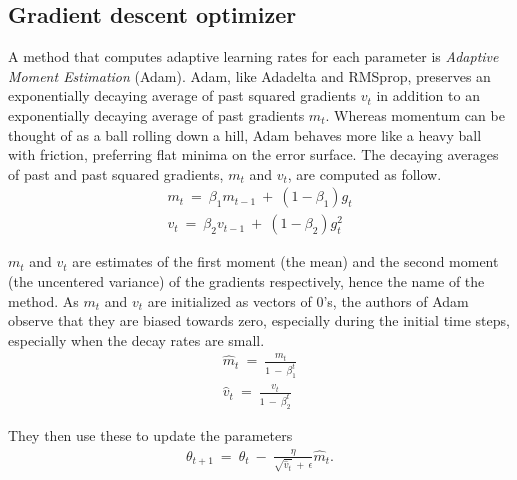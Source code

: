 \subsection{Gradient descent optimizer}
\label{gradient_optimizer}
\hspace{0.5cm}A method that computes adaptive learning rates for each parameter is \textit{Adaptive Moment Estimation} (Adam). Adam, like Adadelta and RMSprop, preserves an exponentially decaying average of past squared gradients $v_t$ in addition to an exponentially decaying average of past gradients $m_t$. Whereas momentum can be thought of as a ball rolling down a hill, Adam behaves more like a heavy ball with friction, preferring flat minima on the error surface. The decaying averages of past and past squared gradients, $m_t$ and $v_t$, are computed as follow.
\begin{align*}
    m_t \: = \: \beta_1 m_{t-1} \: + \: (1-\beta_1)g_{t}\\
    v_t \: = \: \beta_2 v_{t-1} \: + \: (1-\beta_2)g^2_t
\end{align*}


$m_t$ and $v_t$ are estimates of the first moment (the mean) and the second moment (the uncentered variance) of the gradients respectively, hence the name of the method. As $m_t$ and $v_t$ are initialized as vectors of 0's, the authors of Adam observe that they are biased towards zero, especially during the initial time steps, especially when the decay rates are small.
\begin{align*}
    \hat{m}_t \: = \: \frac{m_t}{1\:-\:\beta^t_1} \\
 \hat{v}_t \: = \: \frac{v_t}{1\: - \: \beta^t_2}
\end{align*}



They then use these to update the parameters
\begin{align*}
\theta_{t+1} \: = \: \theta_t \: - \: \frac{\eta}{\sqrt{\hat{v}_t} \: +\: \epsilon} \hat{m}_t.
\end{align*}
